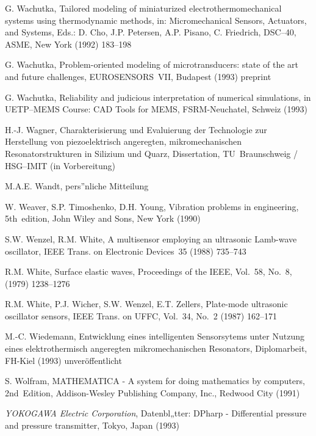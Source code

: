 \begin{thebibliography}{xxx}
 G. Wachutka, Tailored modeling of miniaturized electrothermomechanical
 systems using thermodynamic methods, in: Micromechanical Sensors,
 Actuators, and Systems, Eds.: D. Cho, J.P. Petersen, A.P. Pisano,
 C. Friedrich, DSC--40, ASME, New York (1992) 183--198

 G. Wachutka, Problem-oriented modeling of microtransducers: state of the
 art and future challenges, EUROSENSORS~VII, Budapest (1993) preprint

 G. Wachutka, Reliability and judicious interpretation of numerical
 simulations, in UETP--MEMS Course: CAD Tools for MEMS, FSRM-Neuchatel,
 Schweiz (1993)

 H.-J. Wagner, Charakterisierung und Evaluierung der Technologie zur
 Herstellung von piezoelektrisch angeregten, mikromechanischen
 Resonatorstrukturen in Silizium und Quarz, Dissertation,
 TU~Braunschweig / HSG--IMIT (in Vorbereitung)

 M.A.E. Wandt, pers”nliche Mitteilung

 W. Weaver, S.P. Timoshenko, D.H. Young, Vibration problems in engineering,
 5th~edition, John Wiley and Sons, New York (1990)

 S.W. Wenzel, R.M. White, A multisensor employing an ultrasonic Lamb-wave
 oscillator, IEEE Trans. on Electronic Devices~35 (1988) 735--743

 R.M. White, Surface elastic waves, Proceedings of the IEEE, Vol.~58, No.~8,
 (1979) 1238--1276

 R.M. White, P.J. Wicher, S.W. Wenzel, E.T. Zellers, Plate-mode ultrasonic
 oscillator sensors, IEEE Trans. on UFFC, Vol.~34, No.~2 (1987) 162--171

 M.-C. Wiedemann, Entwicklung eines intelligenten Sensorsytems unter Nutzung
 eines elektrothermisch angeregten mikromechanischen Resonators,
 Diplomarbeit, FH-Kiel (1993) unveröffentlicht

 S. Wolfram, {\sf MATHEMATICA} - A system for doing mathematics by computers,
 2nd~Edition, Addison-Wesley Publishing Company, Inc., Redwood City (1991)

 {\em YOKOGAWA Electric Corporation}, Datenbl„tter: {\sf DPharp} -
 Differential pressure and pressure transmitter, Tokyo, Japan (1993)


\end{thebibliography}
